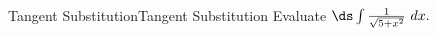 

\begin{example}{Tangent Substitution}{Tangent Substitution}
Evaluate $\ds \int \frac{1}{\sqrt{5+x^2}}\ dx.$
\end{example}

